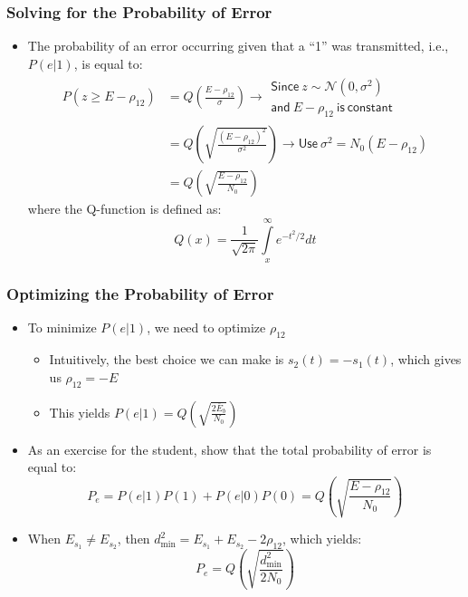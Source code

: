 \documentclass[10pt]{beamer}
\begin{document}
\frame
{
  \frametitle{Solving for the Probability of Error}

  \begin{itemize}
    \item The probability of an error occurring given that a ``1'' was transmitted, i.e., $P(e|1)$, is equal to:
    \begin{equation}
    \begin{split}
        P(z\ge{E-\rho_{12}})&=Q\left(\frac{E-\rho_{12}}{\sigma}\right)\rightarrow
        \begin{array}{l}
          \mathsf{Since}~z\sim\mathcal{N}(0,\sigma^2) \\
          \mathsf{and}~E-\rho_{12}~\mathsf{is~constant}
        \end{array}\\
        &=Q\left(\sqrt{\frac{(E-\rho_{12})^2}{\sigma^2}}\right)\rightarrow\mathsf{Use}~\sigma^2=N_0(E-\rho_{12})\\
        &=Q\left(\sqrt{\frac{E-\rho_{12}}{N_0}}\right)\nonumber
    \end{split}
    \end{equation}
    where the Q-function is defined as:
    \begin{equation}
        Q(x)=\frac{1}{\sqrt{2\pi}}\int\limits_{x}^{\infty}e^{-t^2/2}dt
    \end{equation}
  \end{itemize}

}
\frame
{
  \frametitle{Optimizing the Probability of Error}

  \begin{itemize}
    \item To minimize $P(e|1)$, we need to optimize $\rho_{12}$
    \begin{itemize}
        \item Intuitively, the best choice we can make is $s_2(t)=-s_1(t)$, which gives us $\rho_{12}=-E$
        \item This yields $P(e|1)=Q\left(\sqrt{\frac{2\bar{E}_b}{N_0}}\right)$
    \end{itemize}
    \item As an exercise for the student, show that the total probability of error is equal to:
    \begin{equation}
        P_e=P(e|1)P(1)+P(e|0)P(0)=Q\left(\sqrt{\frac{E-\rho_{12}}{N_0}}\right)
    \end{equation}
    \item When $E_{s_1}\neq{E_{s_2}}$, then $d_{\min}^2=E_{s_1}+E_{s_2}-2\rho_{12}$, which yields:
    \begin{equation}
        P_e=Q\left(\sqrt{\frac{d_{\min}^2}{2N_0}}\right)
    \end{equation}
  \end{itemize}

}
\end{document}
